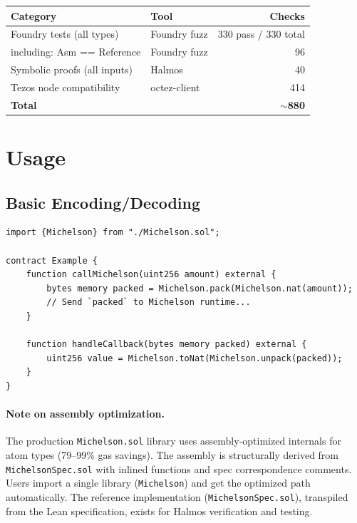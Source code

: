 \documentclass[11pt,a4paper]{article}
\begin{document}
\begin{center}
\begin{tabular}{@{}llr@{}}
\toprule
\textbf{Category} & \textbf{Tool} & \textbf{Checks} \\
\midrule
Foundry tests (all types) & Foundry fuzz & 330 pass / 330 total \\
\quad including: Asm == Reference & Foundry fuzz & 96 \\
Symbolic proofs (all inputs) & Halmos & 40 \\
Tezos node compatibility & octez-client & 414 \\
\midrule
\textbf{Total} & & \textbf{$\sim$880} \\
\bottomrule
\end{tabular}
\end{center}

\section{Usage}

\subsection{Basic Encoding/Decoding}

\begin{codebox}[Solidity]
\begin{lstlisting}[language=Solidity]
import {Michelson} from "./Michelson.sol";

contract Example {
    function callMichelson(uint256 amount) external {
        bytes memory packed = Michelson.pack(Michelson.nat(amount));
        // Send `packed` to Michelson runtime...
    }

    function handleCallback(bytes memory packed) external {
        uint256 value = Michelson.toNat(Michelson.unpack(packed));
    }
}
\end{lstlisting}
\end{codebox}

\paragraph{Note on assembly optimization.}
The production \texttt{Michelson.sol} library uses assembly-optimized internals
for atom types (79--99\% gas savings). The assembly is structurally derived from
\texttt{MichelsonSpec.sol} with inlined functions and spec correspondence
comments. Users import a single library (\texttt{Michelson}) and get the
optimized path automatically. The reference implementation
(\texttt{MichelsonSpec.sol}), transpiled from the Lean specification, exists
for Halmos verification and testing.
\end{document}

